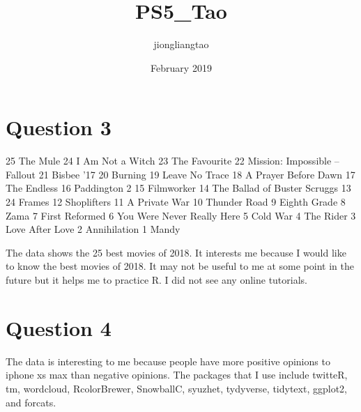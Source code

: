 \documentclass{article}
\title{PS5_Tao}
\author{jiongliangtao }
\date{February 2019}
\begin{document}
\maketitle

\section{Question 3}
25 The Mule
24 I Am Not a Witch
23 The Favourite
22 Mission: Impossible – Fallout
21 Bisbee ’17
20 Burning
19 Leave No Trace
18 A Prayer Before Dawn
17 The Endless
16 Paddington 2
15 Filmworker
14 The Ballad of Buster Scruggs
13 24 Frames
12 Shoplifters
11 A Private War
10 Thunder Road
9 Eighth Grade
8 Zama
7 First Reformed
6 You Were Never Really Here
5 Cold War
4 The Rider
3 Love After Love
2 Annihilation
1 Mandy

The data shows the 25 best movies of 2018. It interests me because I would like to know the best movies of 2018. It may not be useful to me at some point in the future but it helps me to practice R. I did not see any online tutorials. 

\section{Question 4}
The data is interesting to me because people have more positive opinions to iphone xs max than negative opinions. The packages that I use include twitteR, tm, wordcloud, RcolorBrewer, SnowballC, syuzhet, tydyverse, tidytext, ggplot2, and forcats. 
\end{document}
